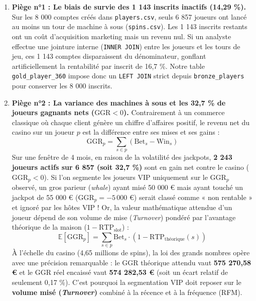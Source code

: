 \documentclass[11pt,a4paper]{article}
\begin{document}
\begin{enumerate}
    \item \textbf{Piège n°1 : Le biais de survie des 1 143 inscrits inactifs (14,29 \%).} Sur les 8 000 comptes créés dans \texttt{players.csv}, seuls 6 857 joueurs ont lancé au moins un tour de machine à sous (\texttt{spins.csv}). Les 1 143 inscrits restants ont un coût d'acquisition marketing mais un revenu nul. Si un analyste effectue une jointure interne (\texttt{INNER JOIN}) entre les joueurs et les tours de jeu, ces 1 143 comptes disparaissent du dénominateur, gonflant artificiellement la rentabilité par inscrit de 16,7 \%. Notre table \texttt{gold\_player\_360} impose donc un \texttt{LEFT JOIN} strict depuis \texttt{bronze\_players} pour conserver les 8 000 inscrits.
    \item \textbf{Piège n°2 : La variance des machines à sous et les 32,7 \% de joueurs gagnants nets ($\text{GGR} < 0$).} Contrairement à un commerce classique où chaque client génère un chiffre d'affaires positif, le revenu net du casino sur un joueur $p$ est la différence entre ses mises et ses gains :
    \begin{equation}
        \text{GGR}_p = \sum_{s \in p} (\text{Bet}_s - \text{Win}_s)
    \end{equation}
    Sur une fenêtre de 4 mois, en raison de la volatilité des jackpots, \textbf{2 243 joueurs actifs sur 6 857 (soit 32,7 \%)} sont en gain net contre le casino ($\text{GGR}_p < 0$). Si l'on segmente les joueurs VIP uniquement sur le $\text{GGR}_p$ observé, un gros parieur (\textit{whale}) ayant misé 50 000 \euro{} mais ayant touché un jackpot de 55 000 \euro{} ($\text{GGR}_p = -5\,000$ \euro) serait classé comme « non rentable » et ignoré par les hôtes VIP ! Or, la valeur mathématique attendue d'un joueur dépend de son volume de mise (\textit{Turnover}) pondéré par l'avantage théorique de la maison ($1 - \text{RTP}_{\text{slot}}$) :
    \begin{equation}
        \mathbb{E}[\text{GGR}_p] = \sum_{s \in p} \text{Bet}_s \cdot (1 - \text{RTP}_{\text{théorique}}(s))
    \end{equation}
    À l'échelle du casino (4,65 millions de spins), la loi des grands nombres opère avec une précision remarquable : le GGR théorique attendu vaut \textbf{575 270,58 \euro} et le GGR réel encaissé vaut \textbf{574 282,53 \euro} (soit un écart relatif de seulement 0,17 \%). C'est pourquoi la segmentation VIP doit reposer sur le \textbf{volume misé (\textit{Turnover})} combiné à la récence et à la fréquence (RFM).

\end{enumerate}
\end{document}
